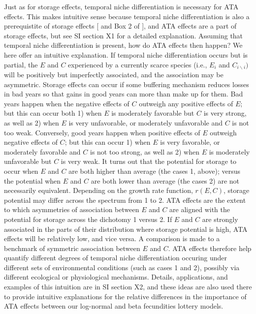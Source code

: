 \documentclass[letterpaper,11pt]{article}
\newcommand{\bs}{\backslash}
\begin{document}
%
Just as for storage effects, temporal niche differentiation is necessary for ATA
effects. This makes intuitive sense because temporal niche differentiation is 
also a prerequistite of storage effects [\cite{Chesson_1994} and Box 2 of \cite{StumpVasseur2023}],
and ATA effects are a part of storage effects, but see
SI section X1 for a detailed explanation. 
%
Assuming that temporal niche differentiation is present, how do ATA effects then happen?
We here offer an intuitive explanation. 
%
If temporal niche differentiation occurs
but is partial, the $E$ and $C$ experienced by a currently scarce 
species (i.e., $E_i$ and $C_{i \bs i})$ will be positively but imperfectly associated, 
and the association may be asymmetric. 
%
Storage effects can occur if some buffering mechanism reduces losses in bad years so that
gains in good years can more than make up for them. 
%
Bad years happen when the negative effects of $C$ outweigh any 
positive effects of $E$; but this can occur
both 1) when $E$ is moderately favorable but $C$ is very strong, as well as 2) when $E$ is very unfavorable,
or moderately unfavorable and $C$ is not too weak.
Conversely, good years happen when positive effects of $E$ outweigh negative effects of $C$;
but this can occur 1) when $E$ is very favorable, or moderately favorable and $C$ is not too strong,
as well as 2) when $E$ is moderately unfavorable but $C$ is very weak. 
%
It turns out that the potential for storage to occur when 
$E$ and $C$ are both higher than average (the cases 1, above); versus the potential  
when $E$ and $C$ are
both lower than average (the cases 2) are not necessarily equivalent.
Depending on the growth rate function, $r(E,C)$, storage potential may differ
across the spectrum from 1 to 2.
%
ATA effects are the extent to which asymmetries of association between $E$ and 
$C$ are aligned with the potential for storage across the dichotomy 1 versus 2.
If $E$ and $C$ are strongly associated in the parts of their distribution where
storage potential is high, ATA effects will be relatively low, and vice versa.
A comparison is made to a benchmark of symmetric association between $E$ and $C$.
%
ATA effects therefore help quantify different degrees of temporal niche differentiation 
occuring under different sets of environmental conditions (such as cases 1 and 2), possibly via
different ecological or physiological mechanisms.
%
Details, applications, and examples of this intuition 
are in SI section X2, and these ideas are also used there to provide 
intuitive explanations for the relative differences in the importance
of ATA effects between our log-normal and beta fecundities lottery models.
\end{document}

